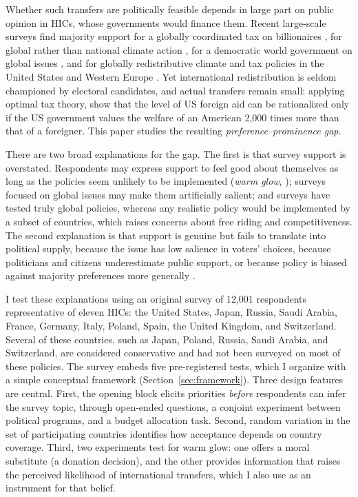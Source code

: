 \documentclass[12pt,english]{article}
\begin{document}
Whether such transfers are politically feasible depends in large part on public opinion in HICs, whose governments would finance them. Recent large-scale surveys find majority support for a globally coordinated tax on billionaires \citep{cappelen_majority_2025}, for global rather than national climate action \citep{dechezlepretre_fighting_2025}, for a democratic world government on global issues \citep{ghassim_who_2024}, and for globally redistributive climate and tax policies in the United States and Western Europe \citep{fabre_majority_2025}. Yet international redistribution is seldom championed by electoral candidates, and actual transfers remain small: applying optimal tax theory, \cite{kopczuk_limitations_2005} show that the level of US foreign aid can be rationalized only if the US government values the welfare of an American 2,000 times more than that of a foreigner. This paper studies the resulting \textit{preference--prominence gap}.

There are two broad explanations for the gap. The first is that survey support is overstated. Respondents may express support to feel good about themselves as long as the policies seem unlikely to be implemented (\textit{warm glow}, \citealp{andreoni_impure_1990,nunes_identifying_2003}); surveys focused on global issues may make them artificially salient; and surveys have tested truly global policies, whereas any realistic policy would be implemented by a subset of countries, which raises concerns about free riding and competitiveness. The second explanation is that support is genuine but fails to translate into political supply, because the issue has low salience in voters' choices, because politicians and citizens underestimate public support, or because policy is biased against majority preferences more generally \citep{gilens_testing_2014,broockman_bias_2018}.

I test these explanations using an original survey of 12,001 respondents representative of eleven HICs: the United States, Japan, Russia, Saudi Arabia, France, Germany, Italy, Poland, Spain, the United Kingdom, and Switzerland. Several of these countries, such as Japan, Poland, Russia, Saudi Arabia, and Switzerland, are considered conservative and had not been surveyed on most of these policies. The survey embeds five pre-registered tests, which I organize with a simple conceptual framework (Section~\ref{sec:framework}). Three design features are central. First, the opening block elicits priorities \textit{before} respondents can infer the survey topic, through open-ended questions, a conjoint experiment between political programs, and a budget allocation task. Second, random variation in the set of participating countries identifies how acceptance depends on country coverage. Third, two experiments test for warm glow: one offers a moral substitute (a donation decision), and the other provides information that raises the perceived likelihood of international transfers, which I also use as an instrument for that belief.
\end{document}
